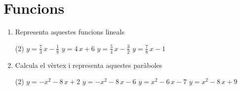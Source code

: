 \documentclass[a4paper]{article},
\begin{document}
  \section{Funcions}
      \begin{enumerate}[resume]
    \item Representa aquestes funcions lineals
    \begin{tasks}(2)
      \task $y = \frac{7}{3}\,x -\frac{1}{8}$
      \task $y = 4\,x+ 6$
      \task $y = \frac{5}{4}\,x -\frac{3}{2}$
      \task $y = \frac{7}{8}\,x -1$
    \end{tasks}
    \item Calcula el vèrtex i representa aquestes paràboles
    \begin{tasks}(2)
      \task $y = -x^2 -8\,x+ 2$
      \task $y = -x^2 -8\,x -6$
      \task $y = x^2 -6\,x -7$
      \task $y = x^2 -8\,x+ 9$
    \end{tasks}
     \end{enumerate}
\end{document}
